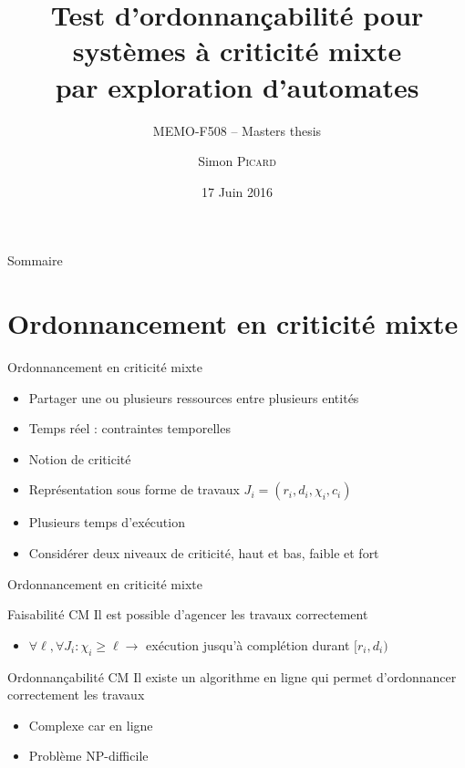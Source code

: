 \documentclass{bredelebeamer}
\title[MEMO-F508]{Test d'ordonnançabilité pour systèmes à criticité mixte\\par exploration d'automates}
\subtitle{MEMO-F508 -- Masters thesis}
\author{Simon \textsc{Picard}}
\institute[ULB]
{
  \textsc{Université libre de Bruxelles}\\
  Faculté des Sciences\\
  Département d'Informatique
  }
\date{17 Juin 2016}
\begin{document}
\begin{frame}
  \titlepage
\end{frame}





\begin{frame}{Sommaire}
  \tableofcontents
\end{frame}



\section[Criticité mixte]{Ordonnancement en criticité mixte}

\begin{frame}{Ordonnancement en criticité mixte}

\begin{itemize}
\item Partager une ou plusieurs ressources entre plusieurs entités
\item Temps réel : contraintes temporelles
\item Notion de criticité
\item Représentation sous forme de travaux $J_i = (r_i, d_i, \chi_i, c_i)$
\item Plusieurs temps d'exécution
\item Considérer deux niveaux de criticité, haut et bas, faible et fort
\end{itemize}

\end{frame}

\begin{frame}{Ordonnancement en criticité mixte}

\begin{exampleblock}{Faisabilité CM}
Il est possible d'agencer les travaux correctement \begin{itemize}
\item $\forall \ell, \forall J_i : \chi_i \geq \ell \rightarrow $ exécution jusqu'à complétion durant $[r_i, d_i)$
\end{itemize}
\end{exampleblock}

\begin{block}{Ordonnançabilité CM}
Il existe un algorithme en ligne qui permet d'ordonnancer correctement les travaux\begin{itemize}
\item Complexe car en ligne
\item Problème NP-difficile
\end{itemize}
\end{block}



\end{frame}
\end{document}
